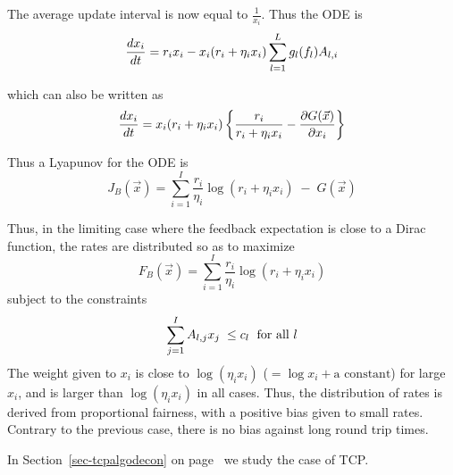  The average update interval is now equal to $\frac{1}{x_i}$. Thus
 the ODE is
\begin{equation}\mylabel{eq-odeevpack}
\frac{dx_{i}}{dt}
        =
        r_i x_i -  x_{i} (r_{i}+\eta_i x_{i}) \sum_{l=1}^{L}
        g_{l}(f_{l})A_{l,i}
\end{equation}

which can also be written as
\begin{equation}\mylabel{eq-odeevpack-2}
\frac{dx_{i}}{dt}
        =
 x_{i}(r_{i}+ \eta_i x_{i})
        \left \{
            \frac{r_{i}}{r_{i}+ \eta_i x_{i}}  -
            \frac{\partial G (\vec{x})}{\partial x_{i}}
        \right \}
\end{equation}

Thus a Lyapunov for the ODE is
$$
J_B(\vec{x})= \sum_{i=1}^I
   \frac{r_i}{\eta_i}\log ( r_{i}+ \eta_i x_{i})
   \; -  \; G(\vec{x})
$$

Thus, in the limiting case where the feedback expectation is close
to a Dirac function, the rates are distributed so as to maximize
$$F_{B}(\vec{x})=\sum_{i=1}^I \frac{r_i}{\eta_i}\log ( r_{i}+ \eta_i x_{i})$$
subject to the constraints
$$
\sum_{j=1}^I A_{l,j}x_{j} \; \leq c_{l} \; \textrm{ for all } l
$$
The weight given to $x_{i}$ is close to $\log(\eta_i x_{i})$ ($=
\log x_i + \mbox{a constant} $) for large $x_i$, and is larger
than $\log(\eta_i x_{i})$ in all cases. Thus, the distribution of
rates is derived from proportional fairness, with a positive bias
given to small rates. Contrary to the previous case, there is no
bias against long round trip times.
%

In Section~\ref{sec-tcpalgodecon} on
page~\pageref{sec-tcpalgodecon} we study the case of TCP.
